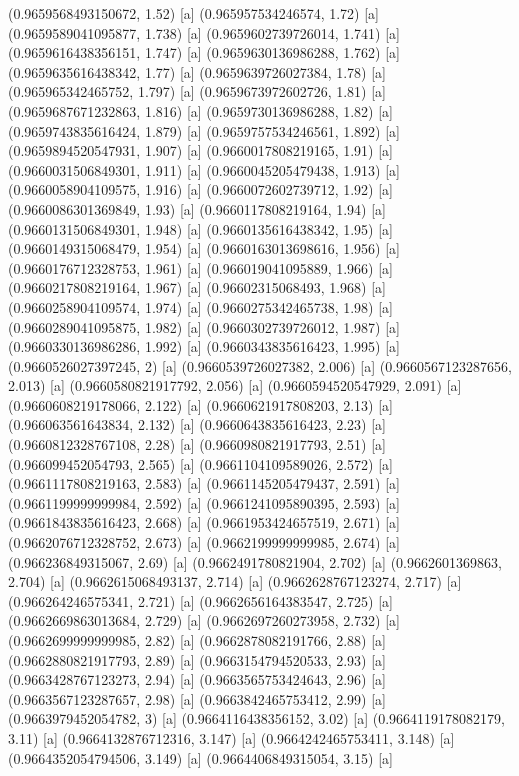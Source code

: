 {{{(0.9659568493150672, 1.52) [a] 
(0.965957534246574, 1.72) [a] 
(0.9659589041095877, 1.738) [a] 
(0.9659602739726014, 1.741) [a] 
(0.9659616438356151, 1.747) [a] 
(0.9659630136986288, 1.762) [a] 
(0.9659635616438342, 1.77) [a] 
(0.9659639726027384, 1.78) [a] 
(0.965965342465752, 1.797) [a] 
(0.9659673972602726, 1.81) [a] 
(0.9659687671232863, 1.816) [a] 
(0.9659730136986288, 1.82) [a] 
(0.9659743835616424, 1.879) [a] 
(0.9659757534246561, 1.892) [a] 
(0.9659894520547931, 1.907) [a] 
(0.9660017808219165, 1.91) [a] 
(0.9660031506849301, 1.911) [a] 
(0.9660045205479438, 1.913) [a] 
(0.9660058904109575, 1.916) [a] 
(0.9660072602739712, 1.92) [a] 
(0.9660086301369849, 1.93) [a] 
(0.9660117808219164, 1.94) [a] 
(0.9660131506849301, 1.948) [a] 
(0.9660135616438342, 1.95) [a] 
(0.9660149315068479, 1.954) [a] 
(0.9660163013698616, 1.956) [a] 
(0.9660176712328753, 1.961) [a] 
(0.966019041095889, 1.966) [a] 
(0.9660217808219164, 1.967) [a] 
(0.96602315068493, 1.968) [a] 
(0.9660258904109574, 1.974) [a] 
(0.9660275342465738, 1.98) [a] 
(0.9660289041095875, 1.982) [a] 
(0.9660302739726012, 1.987) [a] 
(0.9660330136986286, 1.992) [a] 
(0.9660343835616423, 1.995) [a] 
(0.9660526027397245, 2) [a] 
(0.9660539726027382, 2.006) [a] 
(0.9660567123287656, 2.013) [a] 
(0.9660580821917792, 2.056) [a] 
(0.9660594520547929, 2.091) [a] 
(0.9660608219178066, 2.122) [a] 
(0.9660621917808203, 2.13) [a] 
(0.966063561643834, 2.132) [a] 
(0.9660643835616423, 2.23) [a] 
(0.9660812328767108, 2.28) [a] 
(0.9660980821917793, 2.51) [a] 
(0.966099452054793, 2.565) [a] 
(0.9661104109589026, 2.572) [a] 
(0.9661117808219163, 2.583) [a] 
(0.9661145205479437, 2.591) [a] 
(0.9661199999999984, 2.592) [a] 
(0.9661241095890395, 2.593) [a] 
(0.9661843835616423, 2.668) [a] 
(0.9661953424657519, 2.671) [a] 
(0.9662076712328752, 2.673) [a] 
(0.9662199999999985, 2.674) [a] 
(0.966236849315067, 2.69) [a] 
(0.9662491780821904, 2.702) [a] 
(0.9662601369863, 2.704) [a] 
(0.9662615068493137, 2.714) [a] 
(0.9662628767123274, 2.717) [a] 
(0.966264246575341, 2.721) [a] 
(0.9662656164383547, 2.725) [a] 
(0.9662669863013684, 2.729) [a] 
(0.9662697260273958, 2.732) [a] 
(0.9662699999999985, 2.82) [a] 
(0.9662878082191766, 2.88) [a] 
(0.9662880821917793, 2.89) [a] 
(0.9663154794520533, 2.93) [a] 
(0.9663428767123273, 2.94) [a] 
(0.9663565753424643, 2.96) [a] 
(0.9663567123287657, 2.98) [a] 
(0.9663842465753412, 2.99) [a] 
(0.9663979452054782, 3) [a] 
(0.9664116438356152, 3.02) [a] 
(0.9664119178082179, 3.11) [a] 
(0.9664132876712316, 3.147) [a] 
(0.9664242465753411, 3.148) [a] 
(0.9664352054794506, 3.149) [a] 
(0.9664406849315054, 3.15) [a] 
}}}
